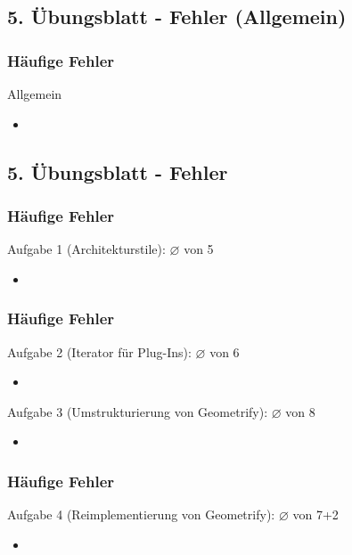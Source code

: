 \documentclass[18pt]{beamer}
\begin{document}
	\subsection{5. Übungsblatt - Fehler (Allgemein)}
	\begin{frame}
		\frametitle{Häufige Fehler}
		\begin{block}{Allgemein}
		\begin{itemize}
		\item %
		\end{itemize}
		\end{block}
	\end{frame}

	\subsection{5. Übungsblatt - Fehler}
	\begin{frame}
		\frametitle{Häufige Fehler}
		\begin{block}{Aufgabe 1 (Architekturstile): $\diameter$   von 5} %
		\begin{itemize}
		\pause 
		\item %
		\end{itemize}
		\end{block}
	\end{frame}

	\begin{frame}
		\frametitle{Häufige Fehler}
		\begin{block}{Aufgabe 2 (Iterator für Plug-Ins): $\diameter$ von 6} %
		\begin{itemize}
		\pause 
		\item %
		\end{itemize}
		\end{block}
		\pause 
		\begin{block}{Aufgabe 3 (Umstrukturierung von Geometrify): $\diameter$ von 8} %
		\begin{itemize}
		\item %
		\end{itemize}
		\end{block}
	\end{frame}

	\begin{frame}
		\frametitle{Häufige Fehler}
		\begin{block}{Aufgabe 4 (Reimplementierung von Geometrify): $\diameter$ von 7+2} %
		\begin{itemize}
		\pause
		\item %
		\end{itemize}
		\end{block}
	\end{frame}
\end{document}
